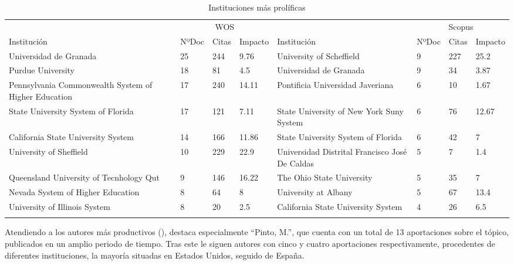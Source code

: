 \documentclass{textolivre}
\begin{document}
\begin{table}[h]
\caption{Instituciones más prolíficas}
\label{tab3}
\centering
\scriptsize
\begin{tabular}{%
    >{\raggedright\arraybackslash}p{}%
    p{}%
    p{}%
    p{}%
    >{\raggedright\arraybackslash}p{}%
    p{}%
    p{}%
    p{}}
\toprule 
& \multicolumn{3}{c}{WOS} & & \multicolumn{3}{c}{Scopus}
\\
Institución	& NºDoc & Citas & Impacto & Institución & NºDoc & Citas & Impacto
\\
\midrule
\arrayrulecolor[gray]{.7}
Universidad de Granada & 25 & 244 & 9.76 & University of Scheffield & 9 & 227 & 25.2
\\
Purdue University & 18 & 81 & 4.5 & Universidad de Granada & 9 & 34 & 3.87
\\
Pennsylvania Commonwealth System of Higher Education & 17 & 240 & 14.11 & Pontificia Universidad Javeriana & 6 & 10 & 1.67
\\
State University System of Florida & 17 & 121 & 7.11 & State University of New York Suny System & 6 & 76 & 12.67
\\
California State University System & 14 & 166 & 11.86 & State University System of Florida & 6 & 42 & 7
\\
University of Sheffield & 10 & 229 & 22.9 & Universidad Distrital Francisco José De Caldas & 5 & 7 & 1.4
\\
Queensland University of Tecnhology Qut & 9 & 146 & 16.22 & The Ohio State University & 5 & 35 & 7
\\
Nevada System of Higher Education & 8 & 64 & 8 & University at Albany & 5 & 67 & 13.4
\\
University of Illinois System & 8 & 20 & 2.5 & California State University System & 4 & 26 & 6.5
\\
\arrayrulecolor{black}
\bottomrule
\end{tabular}
\centering
{}
\end{table}

Atendiendo a los autores más productivos (), destaca especialmente “Pinto, M.”, que cuenta con un total de 13 aportaciones sobre el tópico, publicados en un amplio periodo de tiempo. Tras este le siguen autores con cinco y cuatro aportaciones respectivamente, procedentes de diferentes instituciones, la mayoría situadas en Estados Unidos, seguido de España.
\end{document}
